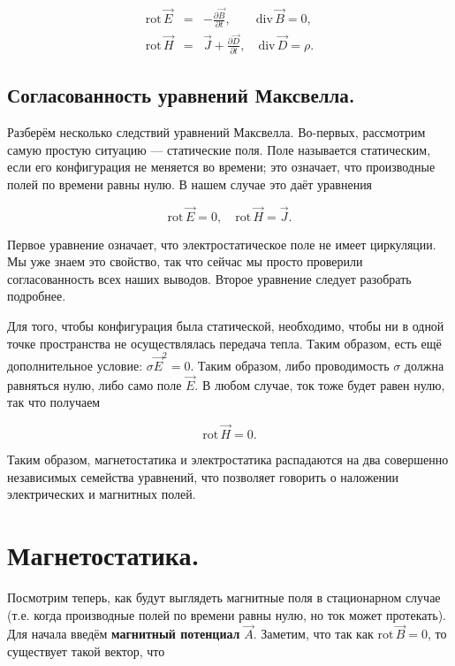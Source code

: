 \documentclass[11pt,a4paper]{article}
\numberwithin{equation}{section}
\newcommand{\nn}{\nonumber}
\newcommand{\pt}{\partial}
\newcommand{\rot}{\mathrm{rot}\,}
\renewcommand{\div}{\mathrm{div}\,}
\begin{document}
\begin{eqnarray}
  \label{eq:maxwell_equations}
  \nn
  \rot \vec{E} &=& - \frac{\pt \vec{B}}{\pt t}, \qquad \div \vec{B} = 0,\\
  \rot \vec{H} &=& \vec{J} + \frac{\pt \vec{D}}{\pt t}, \quad \div
  \vec{D} = \rho.
\end{eqnarray}

\subsection{Согласованность уравнений Максвелла.}
\label{sec:cons_maxwell}

Разберём несколько следствий уравнений Максвелла. Во-первых,
рассмотрим самую простую ситуацию --- статические поля. Поле
называется статическим, если его конфигурация не меняется во времени;
это означает, что производные полей по времени равны нулю. В нашем
случае это даёт уравнения

\begin{equation}
  \label{eq:statics_maxwell_1}
  \rot \vec{E} = 0, \quad \rot \vec{H} = \vec{J}.
\end{equation}

Первое уравнение означает, что электростатическое поле не имеет
циркуляции. Мы уже знаем это свойство, так что сейчас мы просто
проверили согласованность всех наших выводов. Второе уравнение следует
разобрать подробнее. 

Для того, чтобы конфигурация была статической, необходимо, чтобы ни в
одной точке пространства не осуществлялась передача тепла. Таким
образом, есть ещё дополнительное условие: $\sigma \vec{E}^2 =
0$. Таким образом, либо проводимость $\sigma$ должна равняться нулю,
либо само поле $\vec{E}$. В любом случае, ток тоже будет равен нулю,
так что получаем

\begin{equation}
  \label{eq:statics_maxwell_2}
  \rot \vec{H} = 0.
\end{equation}

Таким образом, магнетостатика и электростатика распадаются на два
совершенно независимых семейства уравнений, что позволяет говорить о
наложении электрических и магнитных полей. 

\section{Магнетостатика.}
\label{sec:magnetostatics}

Посмотрим теперь, как будут выглядеть магнитные поля в стационарном
случае (т.е. когда производные полей по времени равны нулю, но ток
может протекать). Для начала введём \textbf{магнитный потенциал}
$\vec{A}$. Заметим, что так как $\rot \vec{B} = 0$, то существует
такой вектор, что 
\end{document}
